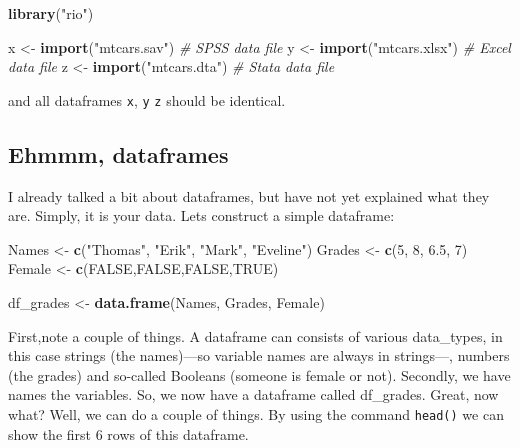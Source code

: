 \documentclass[]{article}
\newenvironment{Shaded}{\begin{snugshade}}{\end{snugshade}}
\newcommand{\KeywordTok}[1]{\textcolor[rgb]{0.13,0.29,0.53}{\textbf{{#1}}}}
\newcommand{\DecValTok}[1]{\textcolor[rgb]{0.00,0.00,0.81}{{#1}}}
\newcommand{\FloatTok}[1]{\textcolor[rgb]{0.00,0.00,0.81}{{#1}}}
\newcommand{\StringTok}[1]{\textcolor[rgb]{0.31,0.60,0.02}{{#1}}}
\newcommand{\CommentTok}[1]{\textcolor[rgb]{0.56,0.35,0.01}{\textit{{#1}}}}
\newcommand{\OtherTok}[1]{\textcolor[rgb]{0.56,0.35,0.01}{{#1}}}
\newcommand{\NormalTok}[1]{{#1}}
\begin{document}
\begin{Shaded}
\begin{Highlighting}[]
\KeywordTok{library}\NormalTok{(}\StringTok{"rio"}\NormalTok{)}

\NormalTok{x <-}\StringTok{ }\KeywordTok{import}\NormalTok{(}\StringTok{"mtcars.sav"}\NormalTok{)  }\CommentTok{# SPSS data file}
\NormalTok{y <-}\StringTok{ }\KeywordTok{import}\NormalTok{(}\StringTok{"mtcars.xlsx"}\NormalTok{) }\CommentTok{# Excel data file}
\NormalTok{z <-}\StringTok{ }\KeywordTok{import}\NormalTok{(}\StringTok{"mtcars.dta"}\NormalTok{)  }\CommentTok{# Stata data file}
\end{Highlighting}
\end{Shaded}

and all dataframes \texttt{x}, \texttt{y} \texttt{z} should be
identical.

\subsection{Ehmmm, dataframes}\label{ehmmm-dataframes}

I already talked a bit about dataframes, but have not yet explained what
they are. Simply, it is your data. Lets construct a simple dataframe:

\begin{Shaded}
\begin{Highlighting}[]
\NormalTok{Names  <-}\StringTok{ }\KeywordTok{c}\NormalTok{(}\StringTok{"Thomas"}\NormalTok{, }\StringTok{"Erik"}\NormalTok{, }\StringTok{"Mark"}\NormalTok{, }\StringTok{"Eveline"}\NormalTok{)}
\NormalTok{Grades <-}\StringTok{ }\KeywordTok{c}\NormalTok{(}\DecValTok{5}\NormalTok{, }\DecValTok{8}\NormalTok{, }\FloatTok{6.5}\NormalTok{, }\DecValTok{7}\NormalTok{)}
\NormalTok{Female <-}\StringTok{ }\KeywordTok{c}\NormalTok{(}\OtherTok{FALSE}\NormalTok{,}\OtherTok{FALSE}\NormalTok{,}\OtherTok{FALSE}\NormalTok{,}\OtherTok{TRUE}\NormalTok{)}

\NormalTok{df_grades <-}\StringTok{ }\KeywordTok{data.frame}\NormalTok{(Names, Grades, Female) }
\end{Highlighting}
\end{Shaded}

First,note a couple of things. A dataframe can consists of various
data\_types, in this case strings (the names)---so variable names are
always in strings---, numbers (the grades) and so-called Booleans
(someone is female or not). Secondly, we have names the variables. So,
we now have a dataframe called df\_grades. Great, now what? Well, we can
do a couple of things. By using the command \texttt{head()} we can show
the first 6 rows of this dataframe.
\end{document}
